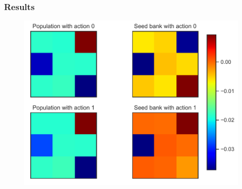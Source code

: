\documentclass{beamer}
\begin{document}
\begin{frame}
	\frametitle{Results}
	\begin{figure}
	  \centering
	  \includegraphics[scale=.40]{Ew.pdf}
	  \label{fig:ew}
	\end{figure}
\end{frame}







\end{document}

